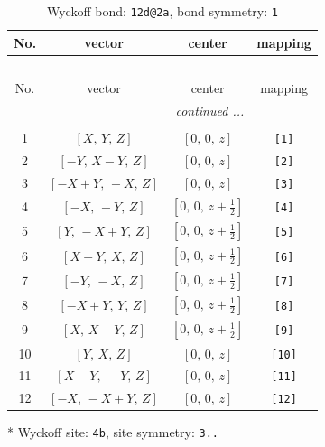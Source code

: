 \documentclass[fleqn,8pt]{jsarticle}
\begin{document}
\begin{longtable}{cccc}
\caption{Wyckoff bond: {\tt 12d@2a}, bond symmetry: {\tt 1}}
 \\
 \hline \hline
No. & vector & center & mapping \\ \hline \endfirsthead

\multicolumn{3}{l}{\tablename\ \thetable{}} \\
 \hline \hline
No. & vector & center & mapping \\ \hline \endhead

 \hline \hline
\multicolumn{3}{r}{\footnotesize\it continued ...} \\ \endfoot

 \hline \hline
\multicolumn{3}{r}{} \\ \endlastfoot

1 & $\left[ X,\, Y,\, Z \right]$ & $\left[ 0,\, 0,\, z \right]$ & {\tt [1]} \\ \hline
2 & $\left[ - Y,\, X - Y,\, Z \right]$ & $\left[ 0,\, 0,\, z \right]$ & {\tt [2]} \\ \hline
3 & $\left[ - X + Y,\, - X,\, Z \right]$ & $\left[ 0,\, 0,\, z \right]$ & {\tt [3]} \\ \hline
4 & $\left[ - X,\, - Y,\, Z \right]$ & $\left[ 0,\, 0,\, z + \frac{1}{2} \right]$ & {\tt [4]} \\ \hline
5 & $\left[ Y,\, - X + Y,\, Z \right]$ & $\left[ 0,\, 0,\, z + \frac{1}{2} \right]$ & {\tt [5]} \\ \hline
6 & $\left[ X - Y,\, X,\, Z \right]$ & $\left[ 0,\, 0,\, z + \frac{1}{2} \right]$ & {\tt [6]} \\ \hline
7 & $\left[ - Y,\, - X,\, Z \right]$ & $\left[ 0,\, 0,\, z + \frac{1}{2} \right]$ & {\tt [7]} \\ \hline
8 & $\left[ - X + Y,\, Y,\, Z \right]$ & $\left[ 0,\, 0,\, z + \frac{1}{2} \right]$ & {\tt [8]} \\ \hline
9 & $\left[ X,\, X - Y,\, Z \right]$ & $\left[ 0,\, 0,\, z + \frac{1}{2} \right]$ & {\tt [9]} \\ \hline
10 & $\left[ Y,\, X,\, Z \right]$ & $\left[ 0,\, 0,\, z \right]$ & {\tt [10]} \\ \hline
11 & $\left[ X - Y,\, - Y,\, Z \right]$ & $\left[ 0,\, 0,\, z \right]$ & {\tt [11]} \\ \hline
12 & $\left[ - X,\, - X + Y,\, Z \right]$ & $\left[ 0,\, 0,\, z \right]$ & {\tt [12]} \\
\end{longtable}
* Wyckoff site: {\tt 4b}, site symmetry: {\tt 3..}
\end{document}
